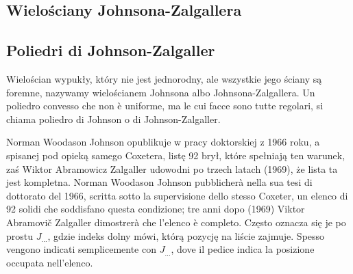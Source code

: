 
%


\subsection{Wielościany Johnsona-Zalgallera} %
\subsection{Poliedri di Johnson-Zalgaller} %

\begin{definition}
    Wielościan wypukły, który nie jest jednorodny, ale wszystkie jego ściany są foremne, nazywamy wielościanem Johnsona albo Johnsona-Zalgallera. %
    Un poliedro convesso che non è uniforme, ma le cui facce sono tutte regolari, si chiama poliedro di Johnson o di Johnson-Zalgaller. %
\end{definition}

Norman Woodason Johnson \cite{johnson_1966} opublikuje w pracy doktorskiej z 1966 roku, a spisanej pod opieką samego Coxetera, listę 92 brył, które spełniają ten warunek, zaś Wiktor Abramowicz Zalgaller \cite{zalgaller_1969} udowodni po trzech latach (1969), że lista ta jest kompletna. %
Norman Woodason Johnson \cite{johnson_1966} pubblicherà nella sua tesi di dottorato del 1966, scritta sotto la supervisione dello stesso Coxeter, un elenco di 92 solidi che soddisfano questa condizione; tre anni dopo (1969) Viktor Abramovič Zalgaller \cite{zalgaller_1969} dimostrerà che l'elenco è completo. %
%
%
Często oznacza się je po prostu $J_{\ldots}$, gdzie indeks dolny mówi, którą pozycję na liście zajmuje. %
Spesso vengono indicati semplicemente con $J_{\ldots}$, dove il pedice indica la posizione occupata nell'elenco. %

